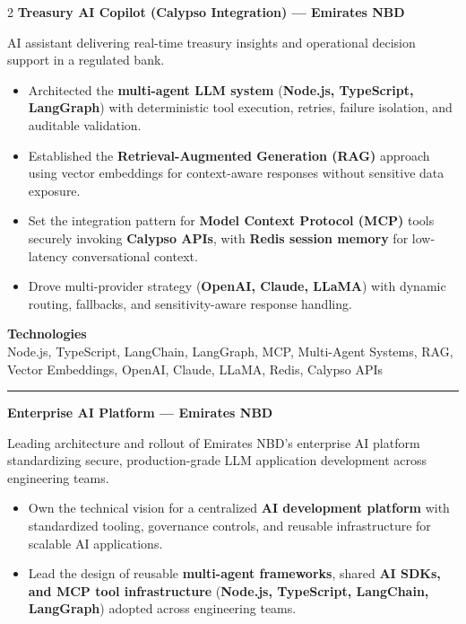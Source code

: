 \documentclass[10pt,a4paper]{article}
\newcommand{\blockdivider}{\vspace{0pt}\color{rulecolor}\rule{\linewidth}{0.5pt}\color{primary}\vspace{4pt}}
\newcommand{\projecttitle}[1]{\textbf{#1}\par\vspace{2pt}}
\begin{document}
\begin{paracol}{2}
\projecttitle{Treasury AI Copilot (Calypso Integration) — Emirates NBD}

AI assistant delivering real-time treasury insights and operational decision support in a regulated bank.

\begin{itemize}

\item Architected the \textbf{multi-agent LLM system} (\textbf{Node.js, TypeScript, LangGraph}) with deterministic tool execution, retries, failure isolation, and auditable validation.

\item Established the \textbf{Retrieval-Augmented Generation (RAG)} approach using vector embeddings for context-aware responses without sensitive data exposure.

\item Set the integration pattern for \textbf{Model Context Protocol (MCP)} tools securely invoking \textbf{Calypso APIs}, with \textbf{Redis session memory} for low-latency conversational context.

\item Drove multi-provider strategy (\textbf{OpenAI, Claude, LLaMA}) with dynamic routing, fallbacks, and sensitivity-aware response handling.

\end{itemize}

\textbf{Technologies}\\
Node.js, TypeScript, LangChain, LangGraph, MCP, Multi-Agent Systems, RAG, Vector Embeddings, OpenAI, Claude, LLaMA, Redis, Calypso APIs

\blockdivider

\projecttitle{Enterprise AI Platform — Emirates NBD}

Leading architecture and rollout of Emirates NBD's enterprise AI platform standardizing secure, production-grade LLM application development across engineering teams.

\begin{itemize}

\item Own the technical vision for a centralized \textbf{AI development platform} with standardized tooling, governance controls, and reusable infrastructure for scalable AI applications.

\item Lead the design of reusable \textbf{multi-agent frameworks}, shared \textbf{AI SDKs, and MCP tool infrastructure} (\textbf{Node.js, TypeScript, LangChain, LangGraph}) adopted across engineering teams.


\end{itemize}
\end{paracol}
\end{document}
